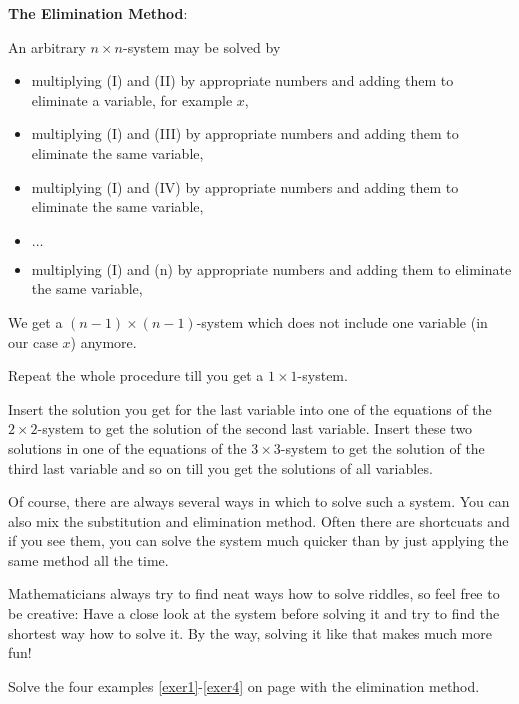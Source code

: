 \begin{tcolorbox}[colback=white]
\textbf{The Elimination Method}:

An arbitrary $n\times n$-system may be solved by
\begin{itemize}
\item multiplying (I) and (II) by appropriate numbers and adding them to eliminate a variable, for example $x$,
\item multiplying (I) and (III) by appropriate numbers and adding them to eliminate the same variable,
\item multiplying (I) and (IV) by appropriate numbers and adding them to eliminate the same variable,
\item $\ldots$
\item multiplying (I) and (n) by appropriate numbers and adding them to eliminate the same variable,
\end{itemize}

We get a $(n-1)\times(n-1)$-system which does not include one variable (in our case $x$) anymore. 

Repeat the whole procedure till you get a $1\times 1$-system. 

Insert the solution you get for the last variable into one of the equations of the $2\times 2$-system to get the solution of the second last variable. Insert these two solutions in one of the equations of the $3\times 3$-system to get the solution of the third last variable and so on till you get the solutions of all variables.
\end{tcolorbox}
\vsp

\begin{remark}
Of course, there are always several ways in which to solve such a system. You can also mix the substitution and elimination method. Often there are shortcuats and if you see them, you can solve the system much quicker than by just applying the same method all the time. 

Mathematicians always try to find neat ways how to solve riddles, so feel free to be creative: Have a close look at the system before solving it and try to find the shortest way how to solve it. By the way, solving it like that makes much more fun!
\end{remark}


\vsp
\begin{exer}
Solve the four examples \ref{exer1}-\ref{exer4} on page \pageref{Einleitungsbeispiele} with the elimination method.
\end{exer}


